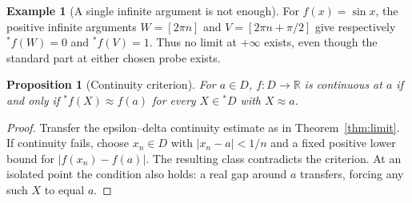 \documentclass[11pt]{article}
\newtheorem{proposition}[theorem]{Proposition}
\theoremstyle{definition}
\newtheorem{example}[theorem]{Example}
\theoremstyle{remark}
\newcommand{\RR}{\mathbb R}
\newcommand{\ext}[1]{{}^{*}\!#1}
\begin{document}
\begin{example}[A single infinite argument is not enough]\label{ex:single-probe}
For \(f(x)=\sin x\), the positive infinite arguments
\(W=[2\pi n]\) and \(V=[2\pi n+\pi/2]\) give respectively
\(\ext f(W)=0\) and \(\ext f(V)=1\). Thus no limit at \(+\infty\) exists,
even though the standard part at either chosen probe exists.
\end{example}
\begin{proposition}[Continuity criterion]\label{prop:continuity}
For \(a\in D\), \(f:D\to\RR\) is continuous at \(a\) if and only if
\(\ext f(X)\approx f(a)\) for every \(X\in\ext D\) with \(X\approx a\).
\end{proposition}
\begin{proof}
Transfer the epsilon--delta continuity estimate as in Theorem~\ref{thm:limit}.
If continuity fails, choose \(x_n\in D\) with \(|x_n-a|<1/n\) and a fixed
positive lower bound for \(|f(x_n)-f(a)|\). The resulting class contradicts
the criterion. At an isolated point the condition also holds: a real gap around
\(a\) transfers, forcing any such \(X\) to equal \(a\).
\end{proof}
\end{document}
